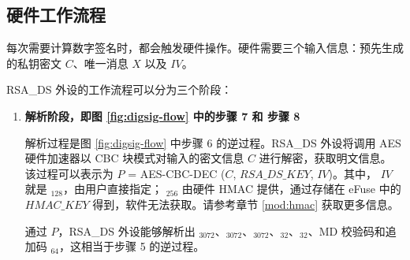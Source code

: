 \documentclass[main\_\_CN.tex]{subfiles}
\begin{document}
\subsection{硬件工作流程}
\label{sec:digsig-hardware-level-operation}

每次需要计算数字签名时，都会触发硬件操作。硬件需要三个输入信息：预先生成的私钥密文 \begin{math}C\end{math}、唯一消息 \begin{math}X\end{math} 以及 \begin{math}IV\end{math}。

RSA\_DS 外设的工作流程可以分为三个阶段：

\begin{enumerate}

    \item {\bfseries 解析阶段，即图 \ref{fig:digsig-flow} 中的步骤 7 和 步骤 8}

        解析过程是图 \ref{fig:digsig-flow} 中步骤 6 的逆过程。RSA\_DS 外设将调用 AES 硬件加速器以 CBC 块模式对输入的密文信息 \begin{math}C\end{math} 进行解密，获取明文信息。
        该过程可以表示为
        \begin{math}P\end{math} = AES-CBC-DEC (\begin{math}C\end{math}, \begin{math}RSA\_DS\_KEY\end{math}, \begin{math}IV\end{math})。其中， \begin{math}IV\end{math} 就是 \begin{math}[IV]_{128}\end{math}，由用户直接指定； \begin{math}[RSA\_DS\_KEY]_{256}\end{math} 由硬件 HMAC 提供，通过存储在 eFuse 中的 \begin{math}HMAC\_KEY\end{math} 得到，软件无法获取。请参考章节 \ref{mod:hmac} \textit{} 获取更多信息。

        通过 \begin{math}P\end{math}，RSA\_DS 外设能够解析出 \begin{math}[Y]_{3072}\end{math}、\begin{math}[M]_{3072}\end{math}、\begin{math}[\overline{r}]_{3072}\end{math}、\begin{math}[M^{\prime}]_{32}\end{math}、\begin{math}[L]_{32}\end{math}、MD 校验码和追加码 \begin{math}[\beta]_{64} \end{math}，这相当于步骤 5 的逆过程。


\end{enumerate}
\end{document}
